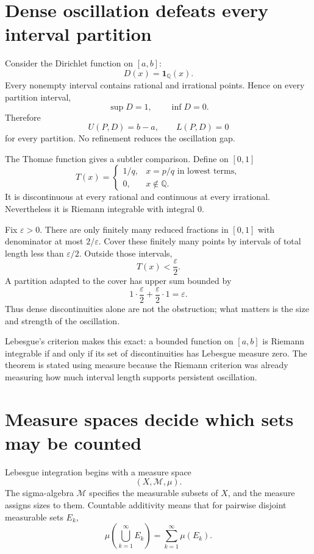 \section{Dense oscillation defeats every interval partition}

Consider the Dirichlet function on \([a,b]\):
\[
  D(x)=\mathbf1_{\mathbb Q}(x).
\]
Every nonempty interval contains rational and irrational points.  Hence on every partition interval,
\[
  \sup D=1,
  \qquad
  \inf D=0.
\]
Therefore
\[
  U(P,D)=b-a,
  \qquad
  L(P,D)=0
\]
for every partition.  No refinement reduces the oscillation gap.

The Thomae function gives a subtler comparison.  Define on \([0,1]\)
\[
  T(x)=
  \begin{cases}
    1/q,&x=p/q\text{ in lowest terms},\\
    0,&x\notin\mathbb Q.
  \end{cases}
\]
It is discontinuous at every rational and continuous at every irrational.  Nevertheless it is Riemann integrable with integral \(0\).

Fix \(\varepsilon>0\).  There are only finitely many reduced fractions in \([0,1]\) with denominator at most \(2/\varepsilon\).  Cover these finitely many points by intervals of total length less than \(\varepsilon/2\).  Outside those intervals,
\[
  T(x)<\frac{\varepsilon}{2}.
\]
A partition adapted to the cover has upper sum bounded by
\[
  1\cdot\frac{\varepsilon}{2}
  +\frac{\varepsilon}{2}\cdot1
  =\varepsilon.
\]
Thus dense discontinuities alone are not the obstruction; what matters is the size and strength of the oscillation.

Lebesgue's criterion makes this exact: a bounded function on \([a,b]\) is Riemann integrable if and only if its set of discontinuities has Lebesgue measure zero.  The theorem is stated using measure because the Riemann criterion was already measuring how much interval length supports persistent oscillation.

\section{Measure spaces decide which sets may be counted}

Lebesgue integration begins with a measure space
\[
  (X,\mathcal M,\mu).
\]
The sigma-algebra \(\mathcal M\) specifies the measurable subsets of \(X\), and the measure assigns sizes to them.  Countable additivity means that for pairwise disjoint measurable sets \(E_k\),
\[
  \mu\left(\bigcup_{k=1}^{\infty}E_k\right)
  =\sum_{k=1}^{\infty}\mu(E_k).
\]

